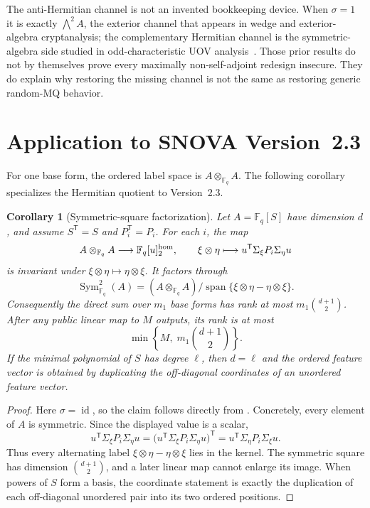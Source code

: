 \documentclass[11pt]{article}
\newtheorem{corollary}[corollary]{Corollary}
\newcommand{\F}{\mathbb F}
\newcommand{\Sym}{\operatorname{Sym}}
\newcommand{\Span}{\operatorname{span}}
\newcommand{\transpose}{\mathsf T}
\begin{document}
The anti-Hermitian channel is not an invented bookkeeping device.  When
$\sigma=1$ it is exactly $\bigwedge^2 A$, the exterior channel that appears
in wedge and exterior-algebra cryptanalysis; the complementary Hermitian
channel is the symmetric-algebra side studied in odd-characteristic UOV
analysis~\cite{Ran2026,JinEtAl2026,BrosEtAl2026SNOVAWedge}.  Those prior
results do not by themselves prove every maximally non-self-adjoint redesign
insecure.  They do explain why restoring the missing channel is not the same
as restoring generic random-MQ behavior.

\section{Application to SNOVA Version~2.3}\label{sec:snova-application}

For one base form, the ordered label space is $A\otimes_{\F_q}A$.  The
following corollary specializes the Hermitian quotient to Version~2.3.

\begin{corollary}[Symmetric-square factorization]\label{thm:symmetry-quotient}
Let $A=\F_q[S]$ have dimension $d$, and assume $S^\transpose=S$ and
$P_i^\transpose=P_i$.  For each $i$, the map
\[
  A\otimes_{\F_q}A\longrightarrow \F_q[u]^{\rm hom}_2,
  \qquad
  \xi\otimes\eta\longmapsto u^\transpose\Sigma_\xi P_i\Sigma_\eta u
\]
is invariant under $\xi\otimes\eta\mapsto\eta\otimes\xi$.  It factors
through
\[
  \Sym^2_{\F_q}(A)=
  (A\otimes_{\F_q}A)/\Span\{\xi\otimes\eta-\eta\otimes\xi\}.
\]
Consequently the direct sum over $m_1$ base forms has rank at most
$m_1\binom{d+1}{2}$.  After any public linear map to $M$ outputs, its rank is
at most
\begin{equation}
  \min\left\{M,\;m_1\binom{d+1}{2}\right\}.          \label{eq:symmetry-cap}
\end{equation}
If the minimal polynomial of $S$ has degree $\ell$, then $d=\ell$ and the
ordered feature vector is obtained by duplicating the off-diagonal
coordinates of an unordered feature vector.
\end{corollary}

\begin{proof}
Here $\sigma=\operatorname{id}$, so the claim follows directly from
.  Concretely, every element of
$A$ is symmetric.  Since the displayed value is a scalar,
\[
 u^\transpose\Sigma_\xi P_i\Sigma_\eta u
 =\bigl(u^\transpose\Sigma_\xi P_i\Sigma_\eta u\bigr)^\transpose
 =u^\transpose\Sigma_\eta P_i\Sigma_\xi u.
\]
Thus every alternating label $\xi\otimes\eta-\eta\otimes\xi$ lies in the
kernel.  The symmetric square has dimension $\binom{d+1}{2}$, and a later
linear map cannot enlarge its image.  When powers of $S$ form a basis, the
coordinate statement is exactly the duplication of each off-diagonal
unordered pair into its two ordered positions.
\end{proof}
\end{document}

